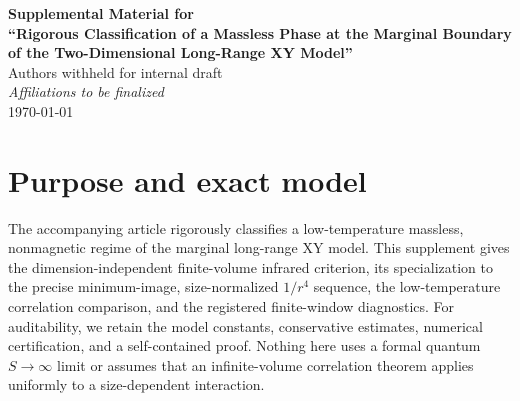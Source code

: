 \documentclass[aps,prb,preprint,notitlepage,groupedaddress,amsmath,amssymb,
               superscriptaddress,nofootinbib,floatfix]{revtex4-2}
\theoremstyle{definition}
\theoremstyle{plain}
\begin{document}
\begin{center}
{\large\bfseries Supplemental Material for\\[0.35em]
``Rigorous Classification of a Massless Phase at the Marginal Boundary
of the Two-Dimensional Long-Range XY Model''}\\[1.0em]
Authors withheld for internal draft\\[0.3em]
\textit{Affiliations to be finalized}\\[1.0em]
\today
\end{center}

\vspace{1em}

\section{Purpose and exact model}

The accompanying article rigorously classifies a low-temperature massless,
nonmagnetic regime of the marginal long-range XY model.  This supplement
gives the dimension-independent finite-volume infrared criterion, its
specialization to the precise minimum-image, size-normalized $1/r^4$
sequence, the low-temperature correlation comparison, and the registered
finite-window diagnostics.  For auditability, we retain the model constants,
conservative estimates, numerical certification, and a self-contained proof.
Nothing here uses a formal quantum $S\to\infty$ limit or assumes that an
infinite-volume correlation theorem applies uniformly to a size-dependent
interaction.
\end{document}

